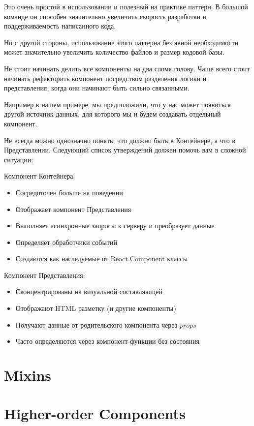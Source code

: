 Это очень простой в использовании и полезный на практике паттерн. В большой команде он способен значительно увеличить скорость разработки и поддерживаемость написанного кода.

Но с другой стороны, использование этого паттерна без явной необходимости может значительно увеличить количество файлов и размер кодовой базы.

Не стоит начинать делить все компоненты на два сломя голову. Чаще всего стоит начинать рефакторить компонент посредством разделения логики и представления, когда они начинают быть сильно связанными. 

Например в нашем примере, мы предположили, что у нас может появиться другой источник данных, для которого мы и будем создавать отдельный компонент.

Не всегда можно однозначно понять, что должно быть в Контейнере, а что в Представлении. Следующий список утверждений должен помочь вам в сложной ситуации:

Компонент Контейнера:

\begin{itemize}
  \item Сосредоточен больше на поведении
  \item Отображает компонент Представления
  \item Выполняет асинхронные запросы к серверу и преобразует данные
  \item Определяет обработчики событий
  \item Создаются как наследуемые от React.Component классы
\end{itemize}


Компонент Представления:

\begin{itemize}
  \item Сконцентрированы на визуальной составляющей 
  \item Отображают HTML разметку (и другие компоненты)
  \item Получают данные от родительского компонента через $props$
  \item Часто определяются через компонент-функции без состояния
\end{itemize}


\section{Mixins}



\section{Higher-order Components}

